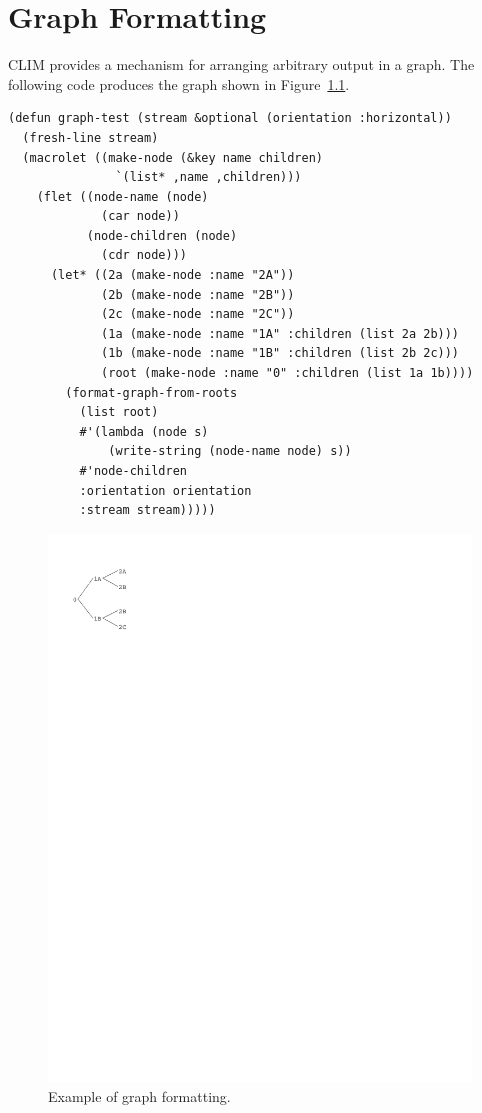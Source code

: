 
\chapter {Graph Formatting}
\label {graph-formatting}

CLIM provides a mechanism for arranging arbitrary output in a graph.  The
following code produces the graph shown in Figure~\ref{graph-example}.

\begin{verbatim}
(defun graph-test (stream &optional (orientation :horizontal)) 
  (fresh-line stream)
  (macrolet ((make-node (&key name children)
               `(list* ,name ,children)))
    (flet ((node-name (node)
             (car node))
           (node-children (node)
             (cdr node)))
      (let* ((2a (make-node :name "2A"))
             (2b (make-node :name "2B"))
             (2c (make-node :name "2C"))
             (1a (make-node :name "1A" :children (list 2a 2b)))
             (1b (make-node :name "1B" :children (list 2b 2c)))
             (root (make-node :name "0" :children (list 1a 1b))))
        (format-graph-from-roots
          (list root)
          #'(lambda (node s)
              (write-string (node-name node) s))
          #'node-children
          :orientation orientation
          :stream stream)))))
\end{verbatim}

\begin{figure}
\centerline{\includegraphics{graph-example}}
\caption{\label{graph-example} Example of graph formatting.}
\end{figure}


